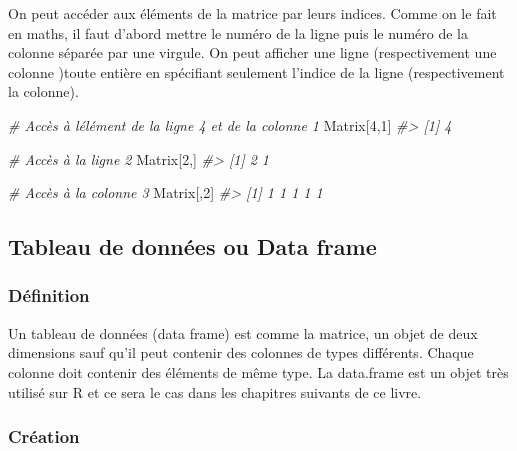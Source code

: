 \documentclass[
]{book}
\newenvironment{Shaded}{\begin{snugshade}}{\end{snugshade}}
\newcommand{\CommentTok}[1]{\textcolor[rgb]{0.56,0.35,0.01}{\textit{#1}}}
\newcommand{\DecValTok}[1]{\textcolor[rgb]{0.00,0.00,0.81}{#1}}
\newcommand{\NormalTok}[1]{#1}
\begin{document}
On peut accéder aux éléments de la matrice par leurs indices. Comme on le fait en maths, il faut d'abord mettre le numéro de la ligne puis le numéro de la colonne séparée par une virgule.
On peut afficher une ligne (respectivement une colonne )toute entière en spécifiant seulement l'indice de la ligne (respectivement la colonne).

\begin{Shaded}
\begin{Highlighting}[]
\CommentTok{\# Accès à l\textquotesingle{}élément de la ligne 4 et de la colonne 1}
\NormalTok{Matrix[}\DecValTok{4}\NormalTok{,}\DecValTok{1}\NormalTok{]}
\CommentTok{\#\textgreater{} [1] 4}
\end{Highlighting}
\end{Shaded}

\begin{Shaded}
\begin{Highlighting}[]
\CommentTok{\# Accès à  la ligne 2 }
\NormalTok{Matrix[}\DecValTok{2}\NormalTok{,]}
\CommentTok{\#\textgreater{} [1] 2 1}
\end{Highlighting}
\end{Shaded}

\begin{Shaded}
\begin{Highlighting}[]
\CommentTok{\# Accès à la colonne 3}
\NormalTok{Matrix[,}\DecValTok{2}\NormalTok{]}
\CommentTok{\#\textgreater{} [1] 1 1 1 1 1}
\end{Highlighting}
\end{Shaded}

\hypertarget{dataframe}{%
\subsection{Tableau de données ou Data frame}\label{dataframe}}

\hypertarget{duxe9finition-4}{%
\subsubsection*{Définition}\label{duxe9finition-4}}

Un tableau de données (data frame) est comme la matrice, un objet de deux dimensions sauf qu'il peut contenir des colonnes de types différents. Chaque colonne doit contenir des éléments de même type. La data.frame est un objet très utilisé sur R et ce sera le cas dans les chapitres suivants de ce livre.

\hypertarget{cruxe9ation-4}{%
\subsubsection*{Création}\label{cruxe9ation-4}}
\end{document}
